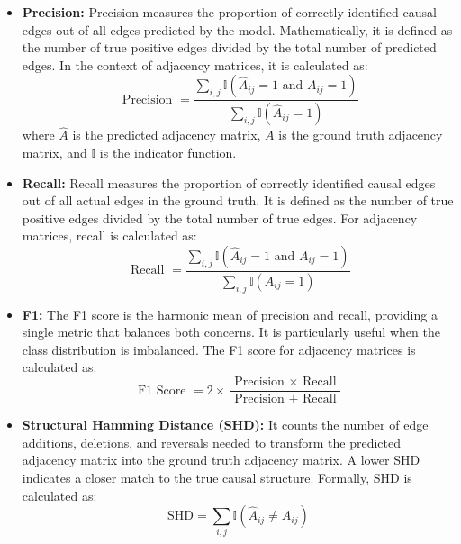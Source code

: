 \begin{itemize}
    \item \textbf{Precision:} Precision measures the proportion of correctly identified causal edges out of all edges predicted by the model. Mathematically, it is defined as the number of true positive edges divided by the total number of predicted edges. In the context of adjacency matrices, it is calculated as:
        \begin{equation}
            \text { Precision }=\frac{\sum_{i, j} \mathbb{I}\left(\hat{A}_{i j}=1 \text { and } A_{i j}=1\right)}{\sum_{i, j} \mathbb{I}\left(\hat{A}_{i j}=1\right)}
        \end{equation}
        where $\hat{A}$ is the predicted adjacency matrix, $A$ is the ground truth adjacency matrix, and $\mathbb{I}$ is the indicator function.
    \item \textbf{Recall:} Recall measures the proportion of correctly identified causal edges out of all actual edges in the ground truth. It is defined as the number of true positive edges divided by the total number of true edges. For adjacency matrices, recall is calculated as:
    \begin{equation}
            \text { Recall }=\frac{\sum_{i, j} \mathbb{I}\left(\hat{A}_{i j}=1 \text { and } A_{i j}=1\right)}{\sum_{i, j} \mathbb{I}\left(A_{i j}=1\right)}
        \end{equation}
        
    \item \textbf{F1:} The F1 score is the harmonic mean of precision and recall, providing a single metric that balances both concerns. It is particularly useful when the class distribution is imbalanced. The F1 score for adjacency matrices is calculated as:
    \begin{equation}
        \text { F1 Score }=2 \times \frac{\text { Precision } \times \text { Recall }}{\text { Precision }+ \text { Recall }}
    \end{equation}
    \item \textbf{Structural Hamming Distance (SHD):} It counts the number of edge additions, deletions, and reversals needed to transform the predicted adjacency matrix into the ground truth adjacency matrix. A lower SHD indicates a closer match to the true causal structure. Formally, SHD is calculated as:
    \begin{equation}
        \mathrm{SHD}=\sum_{i, j} \mathbb{I}\left(\hat{A}_{i j} \neq A_{i j}\right)
    \end{equation}
\end{itemize}

